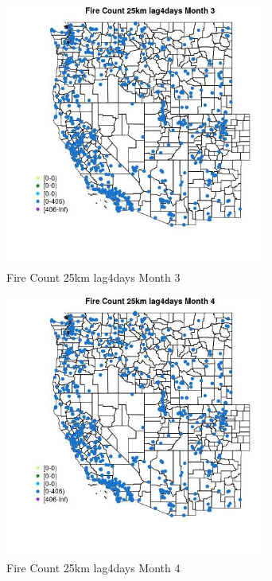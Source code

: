 \begin{figure} 
\centering  
\includegraphics[width=0.77\textwidth]{Code_Outputs/Report_ML_input_PM25_Step4_part_f_de_duplicated_aves_prioritize_24hr_obswNAs_MapObsMo3Fire_Count_25km_lag4days.jpg} 
\caption{\label{fig:Report_ML_input_PM25_Step4_part_f_de_duplicated_aves_prioritize_24hr_obswNAsMapObsMo3Fire_Count_25km_lag4days}Fire Count 25km lag4days Month 3} 
\end{figure} 
 

\begin{figure} 
\centering  
\includegraphics[width=0.77\textwidth]{Code_Outputs/Report_ML_input_PM25_Step4_part_f_de_duplicated_aves_prioritize_24hr_obswNAs_MapObsMo4Fire_Count_25km_lag4days.jpg} 
\caption{\label{fig:Report_ML_input_PM25_Step4_part_f_de_duplicated_aves_prioritize_24hr_obswNAsMapObsMo4Fire_Count_25km_lag4days}Fire Count 25km lag4days Month 4} 
\end{figure} 
 

